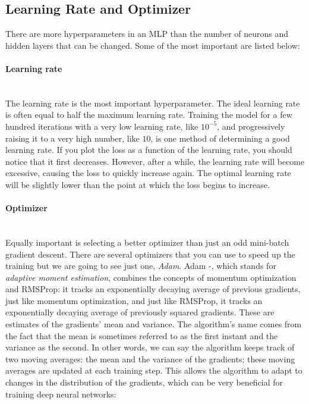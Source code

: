 \subsection{Learning Rate and Optimizer}
There are more hyperparameters in an MLP than the number of neurons and hidden layers that can be changed. Some of the most important are listed below:
\paragraph{Learning rate} \mbox{} \\
\noindent The learning rate is the most important hyperparameter. The ideal learning rate is often equal to half the maximum learning rate.  Training the model for a few hundred iterations with a very low learning rate, like $10^{-5}$, and progressively raising it to a very high number, like $10$, is one method of determining a good learning rate. If you plot the loss as a function of the learning rate, you should notice that it first decreases.
However, after a while, the learning rate will become excessive, causing the loss to quickly increase again. The optimal learning rate will be slightly lower than the point at which the loss begins to increase.

\paragraph{Optimizer}\mbox{}\\
Equally important is selecting a better optimizer than just an odd mini-batch gradient descent. There are several optimizers that you can use to speed up the training but we are going to see just one, \textit{Adam}.
Adam -, which stands for \textit{adaptive moment estimation}, combines the concepts of momentum optimization and RMSProp: it tracks an exponentially decaying average of previous gradients, just like momentum optimization, and just like RMSProp, it tracks an exponentially decaying average of previously squared gradients. These are estimates of the gradients' mean and variance. The algorithm's name comes from the fact that the mean is sometimes referred to as the first instant and the variance as the second.
In other words, we can say the algorithm keeps track of two moving averages: the mean and the variance of the gradients; these moving averages are updated at each training step. This allows the algorithm to adapt to changes in the distribution of the gradients, which can be very beneficial for training deep neural networks:

